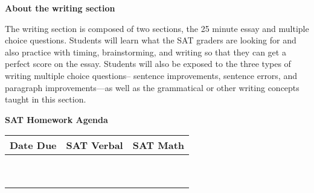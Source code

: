 \bigskip
\textbf{\large About the writing section}

The writing section is composed of two sections, the 25 minute essay and multiple choice questions. Students will learn what the SAT graders are looking for and also practice with timing, brainstorming, and writing so that they can get a perfect score on the essay. Students will also be exposed to the three types of writing multiple choice questions-- sentence improvements, sentence errors, and paragraph improvements—as well as the grammatical or other writing concepts taught in this section.

\newpage
\centerline{\textbf{SAT Homework Agenda}}

\bigskip
\begin{spacing}{1.5}
\begin{tabularx}{\textwidth}{|*3{@{}>{\bfseries\centering\arraybackslash}X|}}\hline
Date Due & SAT Verbal & SAT Math\\\hline
& & \\[8ex]\hline
& & \\[8ex]\hline
& & \\[8ex]\hline
& & \\[8ex]\hline
& & \\[8ex]\hline
& & \\[8ex]\hline
& & \\[8ex]\hline
& & \\[8ex]\hline
& & \\[8ex]\hline
\end{tabularx}
\end{spacing}
